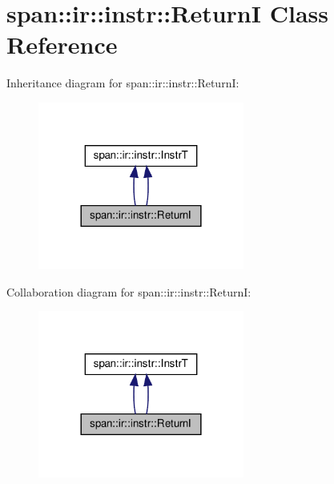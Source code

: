 \hypertarget{classspan_1_1ir_1_1instr_1_1ReturnI}{}\section{span\+:\+:ir\+:\+:instr\+:\+:ReturnI Class Reference}
\label{classspan_1_1ir_1_1instr_1_1ReturnI}


Inheritance diagram for span\+:\+:ir\+:\+:instr\+:\+:ReturnI\+:\nopagebreak
\begin{figure}[H]
\begin{center}
\leavevmode
\includegraphics[width=192pt]{classspan_1_1ir_1_1instr_1_1ReturnI__inherit__graph}
\end{center}
\end{figure}


Collaboration diagram for span\+:\+:ir\+:\+:instr\+:\+:ReturnI\+:\nopagebreak
\begin{figure}[H]
\begin{center}
\leavevmode
\includegraphics[width=192pt]{classspan_1_1ir_1_1instr_1_1ReturnI__coll__graph}
\end{center}
\end{figure}
